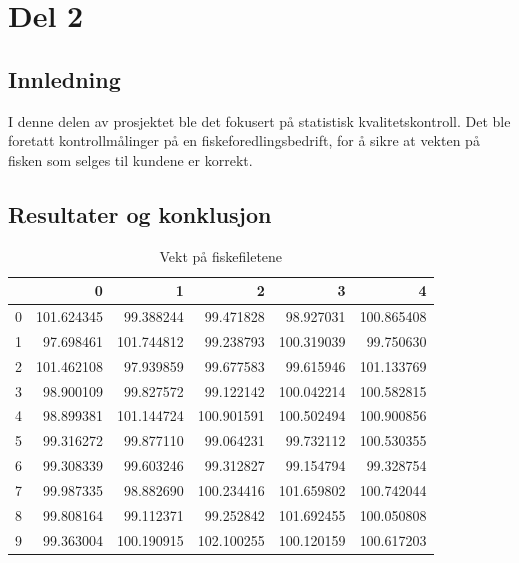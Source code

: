 \documentclass[12pt]{article}
\begin{document}
\pagebreak
\section{Del 2}
\subsection{Innledning}
I denne delen av prosjektet ble det fokusert på statistisk kvalitetskontroll. Det ble foretatt kontrollmålinger på en fiskeforedlingsbedrift, for å sikre at vekten på fisken som selges til kundene er korrekt.


\subsection{Resultater og konklusjon}

\begin{table}[H]
\centering
\caption{Vekt på fiskefiletene}
\begin{tabular}{lrrrrr}
\toprule
{} &           0 &           1 &           2 &           3 &           4 \\
\midrule
0 &  101.624345 &   99.388244 &   99.471828 &   98.927031 &  100.865408 \\
1 &   97.698461 &  101.744812 &   99.238793 &  100.319039 &   99.750630 \\
2 &  101.462108 &   97.939859 &   99.677583 &   99.615946 &  101.133769 \\
3 &   98.900109 &   99.827572 &   99.122142 &  100.042214 &  100.582815 \\
4 &   98.899381 &  101.144724 &  100.901591 &  100.502494 &  100.900856 \\
5 &   99.316272 &   99.877110 &   99.064231 &   99.732112 &  100.530355 \\
6 &   99.308339 &   99.603246 &   99.312827 &   99.154794 &   99.328754 \\
7 &   99.987335 &   98.882690 &  100.234416 &  101.659802 &  100.742044 \\
8 &   99.808164 &   99.112371 &   99.252842 &  101.692455 &  100.050808 \\
9 &   99.363004 &  100.190915 &  102.100255 &  100.120159 &  100.617203 \\
\bottomrule
\end{tabular}

\label{tab:tab5}
\end{table}
\end{document}
